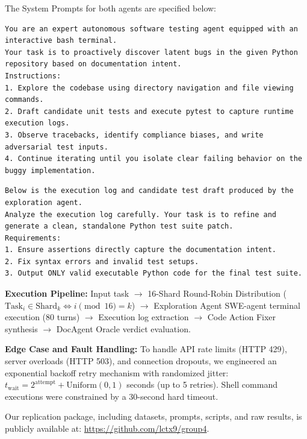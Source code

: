 The System Prompts for both agents are specified below:

\begin{lstlisting}[caption={System Prompt for Exploration Agent}, label={lst:prompt_explore}]
You are an expert autonomous software testing agent equipped with an interactive bash terminal.
Your task is to proactively discover latent bugs in the given Python repository based on documentation intent.
Instructions:
1. Explore the codebase using directory navigation and file viewing commands.
2. Draft candidate unit tests and execute pytest to capture runtime execution logs.
3. Observe tracebacks, identify compliance biases, and write adversarial test inputs.
4. Continue iterating until you isolate clear failing behavior on the buggy implementation.
\end{lstlisting}

\begin{lstlisting}[caption={System Prompt for Code Action Fixer Agent}, label={lst:prompt_fixer}]
Below is the execution log and candidate test draft produced by the exploration agent.
Analyze the execution log carefully. Your task is to refine and generate a clean, standalone Python test suite patch.
Requirements:
1. Ensure assertions directly capture the documentation intent.
2. Fix syntax errors and invalid test setups.
3. Output ONLY valid executable Python code for the final test suite.
\end{lstlisting}

\textbf{Execution Pipeline:} Input task $\rightarrow$ 16-Shard Round-Robin Distribution ($\text{Task}_i \in \text{Shard}_k \iff i \pmod{16} = k$) $\rightarrow$ Exploration Agent SWE-agent terminal execution (80 turns) $\rightarrow$ Execution log extraction $\rightarrow$ Code Action Fixer synthesis $\rightarrow$ DocAgent Oracle verdict evaluation.

\textbf{Edge Case and Fault Handling:} To handle API rate limits (HTTP 429), server overloads (HTTP 503), and connection dropouts, we engineered an exponential backoff retry mechanism with randomized jitter: $t_{\text{wait}} = 2^{\text{attempt}} + \text{Uniform}(0, 1)$ seconds (up to 5 retries). Shell command executions were constrained by a 30-second hard timeout.

Our replication package, including datasets, prompts, scripts, and raw results, is publicly available at: \url{https://github.com/lctx9/group4}.

